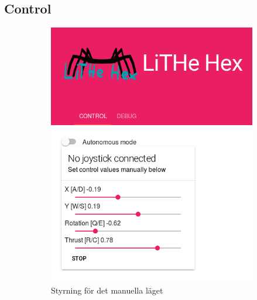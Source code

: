 \documentclass[a4paper,titlepage,12pt]{article}
\begin{document}
	\subsection{Control}\label{gui:control}
	\begin{figure}[h]
      \centering
      \begin{subfigure}{.5\textwidth}
        \centering
		\includegraphics[width=1\linewidth]{images/gui-control.png}
        \caption{Styrning för det manuella läget}
      \end{subfigure}
      \begin{subfigure}{.5\textwidth}
        \centering

\end{subfigure}
\end{figure}
\end{document}
